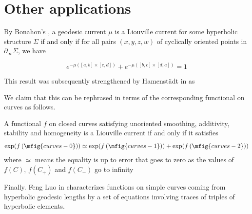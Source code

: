 \section{Other applications}

By Bonahon's \cite[Proposition~17]{Bonahon88:GeodesicCurrent}, a geodesic current $\mu$ is a Liouville current for some hyperbolic structure $\Sigma$ if and only if for all pairs $(x,y,z,w)$ of cyclically oriented points in $\partial_{\infty}\Sigma$, we have

\begin{equation}\label{eq:BonahonLiouville}
  e^{-\mu([a,b]\times[c,d])} + e^{-\mu([b,c] \times [d,a])}=1
\end{equation}

This result was subsequently strengthened by Hamenst\"adt in \cite[Corollary~2.12]{Ham99:Cocycles} as

We claim that this can be rephrased in terms of the corresponding functional on curves as follows.

\begin{conjecture}
A functional $f$ on closed curves satisfying unoriented smoothing, additivity, stability and homogeneity is a Liouville current if and only if it satisfies
    \begin{equation}
      \exp(f\left(\mfig{curves-0}\right)) \simeq  \exp(f\left(\mfig{curves-1}\right)) + \exp(f\left(\mfig{curves-2}\right))
    \end{equation}
where $\simeq$ means the equality is up to error that goes to zero as the values of $f(C)$, $f(C_+)$ and $f(C_-)$ go to infinity 
\end{conjecture}

Finally. Feng Luo in \cite{Luo98:GeodesicLength} characterizes functions on simple curves coming from hyperbolic geodesic lengths by a set of equations involving traces of triples of hyperbolic elements.

